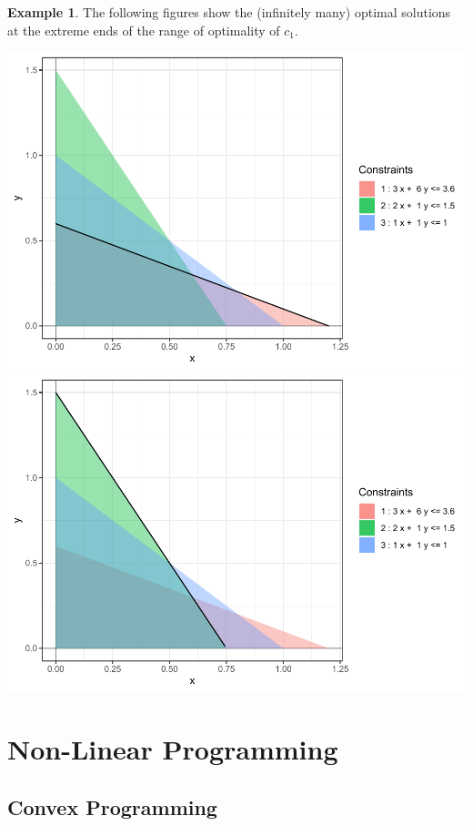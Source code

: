 \documentclass[
]{book}
\theoremstyle{definition}
\theoremstyle{definition}
\newtheorem{example}{Example}[chapter]
\theoremstyle{definition}
\theoremstyle{definition}
\theoremstyle{remark}
\begin{document}
\begin{example}
The following figures show the (infinitely many) optimal solutions at the extreme ends of the range of optimality of \(c_1\).

\includegraphics{Introduction-to-Optimization_files/figure-latex/fig-bounds-c1-1.pdf} \includegraphics{Introduction-to-Optimization_files/figure-latex/fig-bounds-c1-2.pdf}
\end{example}

\hypertarget{part-non-linear-programming}{%
\part{Non-Linear Programming}\label{part-non-linear-programming}}

\hypertarget{convex-programming}{%
\chapter{Convex Programming}\label{convex-programming}}
\end{document}
